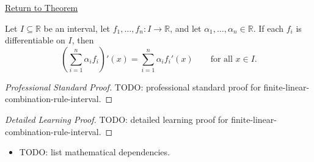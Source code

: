 \newpage
{}
\label{prf:finite-linear-combination-rule-interval}

\begin{remark*}[Return]
\hyperref[thm:finite-linear-combination-rule-interval]{Return to Theorem}
\end{remark*}

\begin{theorem*}
Let $I \subseteq \mathbb{R}$ be an interval, let $f_1, \dots, f_n : I \to \mathbb{R}$, and let $\alpha_1, \dots, \alpha_n \in \mathbb{R}$. If each $f_i$ is differentiable on $I$, then
\[
\left(\sum_{i=1}^{n} \alpha_i f_i\right)'(x) = \sum_{i=1}^{n} \alpha_i f_i'(x) \qquad \text{for all } x \in I.
\]
\end{theorem*}

\begin{proof}[Professional Standard Proof]
\LRAProofBodyStart
TODO: professional standard proof for finite-linear-combination-rule-interval.
\end{proof}

\begin{proof}[Detailed Learning Proof]
\LRAProofBodyStart
TODO: detailed learning proof for finite-linear-combination-rule-interval.
\end{proof}

\begin{remark*}
\end{remark*}

\begin{dependencies}
\begin{itemize}
  \item TODO: list mathematical dependencies.
\end{itemize}
\end{dependencies}

\clearpage
